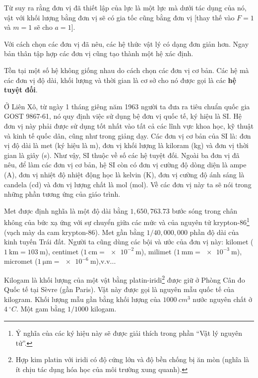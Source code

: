 \noindent
Từ  suy ra rằng đơn vị đã thiết lập của lực là một lực mà dưới tác dụng của nó, vật với khối lượng bằng đơn vị sẽ có gia tốc cũng bằng đơn vị [thay thế vào  $F=1$ và $m=1$ sẽ cho $a=1$].

Với cách chọn các đơn vị đã nêu, các hệ thức vật lý có dạng đơn giản hơn. Ngay bản thân tập hợp các đơn vị cũng tạo thành một hệ xác định.

Tồn tại một số hệ không giống nhau do cách chọn các đơn vị cơ bản. Các hệ mà các đơn vị độ dài, khối lượng và thời gian là cơ sở cho nó được gọi là các \textbf{hệ tuyệt đối}.

Ở Liên Xô, từ ngày 1 tháng giêng năm 1963 người ta đưa ra tiêu chuẩn quốc gia GOST 9867-61, nó quy định việc sử dụng bệ đơn vị quốc tế, ký hiệu là SI. Hệ đơn vị này phải được sử dụng tốt nhất vào tất cả các lĩnh vực khoa học, kỹ thuật và kinh tế quốc dân, cũng như trong giảng dạy. Các đơn vị cơ bản của SI là: đơn vị độ dài là met (ký hiệu là \si{\metre}), đơn vị khối lượng là kiloram (\si{\kilo\gram}) và đơn vị thời gian là giây (\si{\second}). Như vậy, SI thuộc về số các hệ tuyệt đối. Ngoài ba đơn vị đã nêu, để làm các đơn vị cơ bản, hệ SI còn có đơn vị cường độ dòng diện là ampe (\si{\ampere}), đơn vị nhiệt độ nhiệt động học là kelvin (\si{\kelvin}), đơn vị cường độ ánh sáng là candela (\si{\candela}) và đơn vị lượng chất là mol (\si{\mole}). Về các đơn vị này ta sẽ nói trong những phần tương ứng của giáo trình.

Met được định nghĩa là một độ dài bằng $1,650,763.73$ bước sóng trong chân không của bức xạ ứng với sự chuyển giữa các mức  và  của nguyên tử krypton-86\footnote{Ý nghĩa của các ký hiệu này sẽ được giải thích trong phần ``Vật lý nguyên tử''.} (vạch mày da cam krypton-86). Met gần bằng $1/40,000,000$ phần độ dài của kinh tuyến Trái đất. Người ta cũng dùng các bội và ước của đơn vị này: kilomet ($\SI{1}{\kilo\metre}=\SI{103}{\metre}$), centimet ($\SI{1}{\centi\metre}=\SI{e-2}{\metre}$), milimet ($\SI{1}{\milli\metre}=\SI{e-3}{\metre}$), micromet ($\SI{1}{\micro\metre}=\SI{e-6}{\metre}$),v.v...

Kilogam là khối lượng của một vật bằng platin-iridi\footnote{Hợp kim platin với iridi có độ cứng lớn và độ bền chống bị ăn mòn (nghĩa là ít chịu tác dụng hóa học của môi trường xung quanh).} được giữ ở Phòng Cân đo Quốc tế tại S\`evre (gần Paris). Vật này được gọi là nguyên mẫu quốc tế của kilogram. Khối lượng mẫu gần bằng khối lượng của $\SI{1000}{cm^3}$ nước nguyên chất ở $\SI{4}{^{\circ}C}$. Một gam bằng $1/1000$ kilogam.

